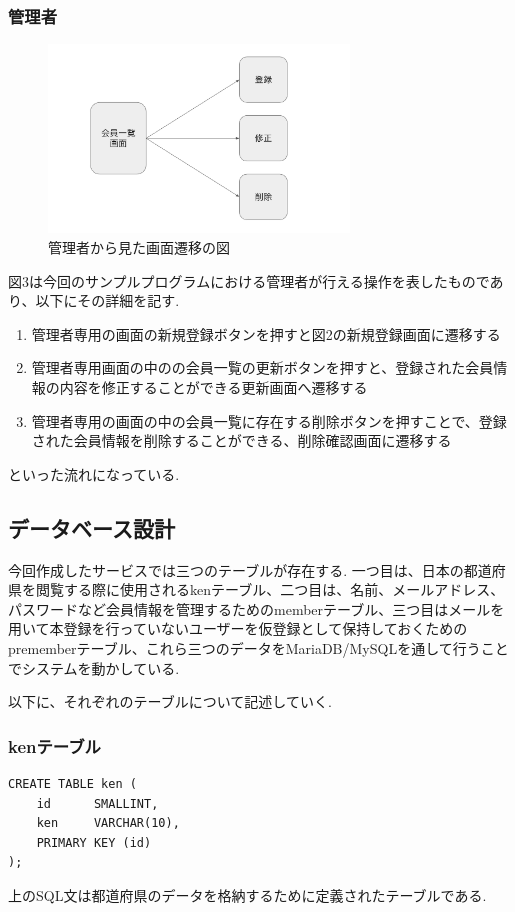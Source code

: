 \documentclass[submit,techrep]{ipsj}
\begin{document}
\subsubsection{管理者}
\begin{figure}[htbp]
  \centering
 \includegraphics[width=8cm]{./images/manager_screen.jpg}
  \caption{管理者から見た画面遷移の図}
  \label{fig:sample}
\end{figure}

図3は今回のサンプルプログラムにおける管理者が行える操作を表したものであり、以下にその詳細を記す.

\begin{enumerate}
  \item 管理者専用の画面の新規登録ボタンを押すと図2の新規登録画面に遷移する
  \item 管理者専用画面の中のの会員一覧の更新ボタンを押すと、登録された会員情報の内容を修正することができる更新画面へ遷移する
  \item  管理者専用の画面の中の会員一覧に存在する削除ボタンを押すことで、登録された会員情報を削除することができる、削除確認画面に遷移する
  \end{enumerate}
といった流れになっている.

\subsection{データベース設計}
今回作成したサービスでは三つのテーブルが存在する.
一つ目は、日本の都道府県を閲覧する際に使用されるkenテーブル、二つ目は、名前、メールアドレス、パスワードなど会員情報を管理するためのmemberテーブル、三つ目はメールを用いて本登録を行っていないユーザーを仮登録として保持しておくためのprememberテーブル、これら三つのデータをMariaDB/MySQLを通して行うことでシステムを動かしている.

以下に、それぞれのテーブルについて記述していく.

\subsubsection{kenテーブル}
\begin{verbatim}
CREATE TABLE ken (
    id      SMALLINT,
    ken     VARCHAR(10),
    PRIMARY KEY (id)
);
\end{verbatim}
上のSQL文は都道府県のデータを格納するために定義されたテーブルである.
\end{document}
